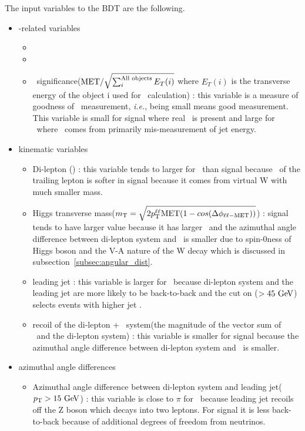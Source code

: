 The input variables to the BDT are the following. 
\begin{itemize}

%
\item \met-related variables
\begin{itemize}
\item \pmet 
\item \ptrkmet  
\item \met\ significance($\mathrm{MET} / \sqrt{\sum_{i}^{\textrm{All objects}} E_T(i)}$
      where $E_T(i)$ is the transverse energy of the object i used for \met\ calculation) : this 
      variable is a measure of goodness of \met\ measurement, \textit{i.e.}, being small 
      means good measurement. This variable is small for signal where real \met\ is present
      and large for \dyll\ where \met\ comes from primarily mis-measurement of jet energy. 
\end{itemize}

%
\item kinematic variables
\begin{itemize}
\item Di-lepton \pt(\ptll) : this variable tends to larger for \dyll\ than signal because 
      \pt\ of the trailing lepton is softer in signal because it comes from virtual W
      with much smaller mass.

\item Higgs transverse mass($m_{\mathrm{T}}=\sqrt{2p_\mathrm{T}^{\ell\ell}\mathrm{MET}(1-cos(\Delta\phi_{\ell\ell-\mathrm{MET}}))}$) : 
      signal tends to have larger value because it has larger \met\ and the azimuthal 
      angle difference between di-lepton system and \met\ is smaller due to spin-0ness 
      of Higgs boson and the V-A nature of the W decay which is discussed in 
      subsection~\ref{subsec:angular_dist}.

\item leading jet \pt : this variable is larger for \dyll\ because di-lepton system 
      and the leading jet are more likely to be back-to-back and the cut on \ptll($>45~\mathrm{Ge\kern -0.1em V}$)  
      selects events with higher jet \pt. 

\item recoil of the di-lepton + \met\ system(the magnitude of the vector sum of 
      \pfmet\ and the di-lepton system) : this variable is smaller for signal because 
      the azimuthal angle difference between di-lepton system and \met\ is smaller.

\end{itemize}

%
\item azimuthal angle differences 
\begin{itemize}
\item Azimuthal angle difference between di-lepton system and leading jet($p_\mathrm{T}>15~\mathrm{Ge\kern -0.1em V}$) : 
      this variable is close to $\pi$ for \dyll\ because leading jet recoils off the Z boson 
      which decays into two leptons. For signal it is less back-to-back because of additional
      degrees of freedom from neutrinos. 


\end{itemize}
\end{itemize}

